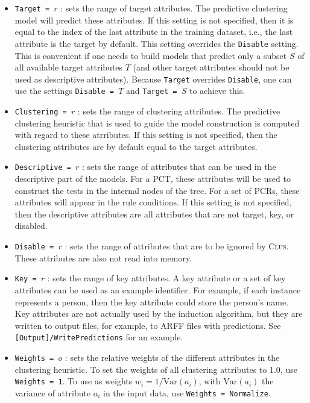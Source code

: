 \documentclass[a4paper]{report}
\newcommand{\clus}{\textsc{Clus}}
\begin{document}
\begin{itemize}
\item {\tt Target = $r$} : sets the range of target attributes. The predictive clustering model will predict these attributes. If this setting is not specified, then it is equal to the index of the last attribute in the training dataset, i.e., the last attribute is the target by default. This setting overrides the \texttt{Disable} setting. This is convenient if one needs to build models that predict only a subset $S$ of all available target attributes $T$ (and other target attributes should not be used as descriptive attributes). Because {\tt Target} overrides {\tt Disable}, one can use the settings {\tt Disable = $T$} and {\tt Target = $S$} to achieve this. 

\item {\tt Clustering = $r$} : sets the range of clustering attributes. The predictive clustering heuristic that is used to guide the model construction is computed with regard to these atrributes. If this setting is not specified, then the clustering attributes are by default equal to the target attributes.

\item {\tt Descriptive = $r$} : sets the range of attributes that can be used in the descriptive part of the models. For a PCT, these attributes will be used to construct the tests in the internal nodes of the tree. For a set of PCRs, these attributes will appear in the rule conditions. If this setting is not specified, then the descriptive attributes are all attributes that are not target, key, or disabled.

\item {\tt Disable = $r$} : sets the range of attributes that are to be ignored by \clus. These attributes are also not read into memory.

\item {\tt Key = $r$} : sets the range of key attributes. A key attribute or a set of key attributes can be used as an example identifier. For example, if each instance represents a person, then the key attribute could store the person's name. Key attributes are not actually used by the induction algorithm, but they are written to output files, for example, to ARFF files with predictions. See \texttt{[Output]/WritePredictions} for an example.

\item {\tt Weights = $o$} : sets the relative weights of the different attributes in the clustering heuristic. To set the weights of all clustering attributes to 1.0, use {\tt Weights = 1}. To use as  weights $w_i = 1/\mathrm{Var}(a_i)$, with $\mathrm{Var}(a_i)$ the variance of attribute $a_i$ in the input data, use {\tt Weights = Normalize}.
\end{itemize}
\end{document}
